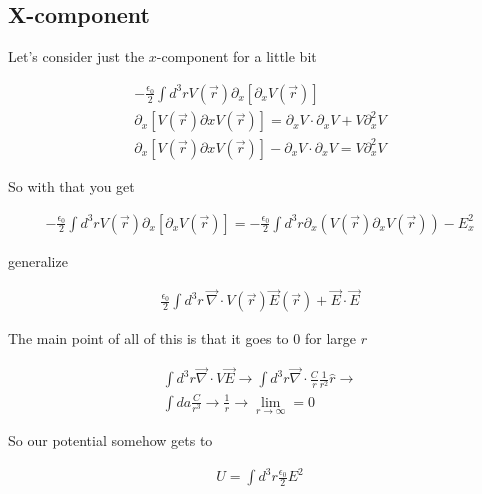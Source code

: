 \documentclass[fleqn]{report}
\newcommand{\del}{\partial}
\newcommand{\equations} [1] {
\begin{gather*}
#1
\end{gather*}
}
\begin{document}
\subsection{X-component}
Let's consider just the $x$-component for a little bit 

\equations{
    - \frac{\epsilon_0}{2} 
    \int d^3 r V(\vec r) \del_x \left[ \del_x V(\vec r) \right]
    \\
    \del_x \left[ V(\vec r) \del x V(\vec r) \right]
    =
    \del_x V \cdot \del_x V + V \del_x^2 V 
    \\
    \del_x \left[ V(\vec r) \del x V(\vec r) \right]
    - \del_x V \cdot \del_x V 
    =
    V \del_x^2 V 
}
So with that you get 
\equations{
    - \frac{\epsilon_0}{2} 
    \int d^3 r V(\vec r) \del_x \left[ \del_x V(\vec r)\right]
    =
    - \frac{\epsilon_0}{2} 
    \int d^3 r \del_x \left( V(\vec r) \del_x V (\vec r)\right)
    - E_x^2
}
generalize 
\equations{
    \frac{\epsilon_0}{2} 
    \int d^3 r \, \vec \nabla \cdot V(\vec r) \vec E(\vec r) + 
    \vec E \cdot \vec E 
}

The main point of all of this is that it goes to $0$ for large $r$ 
\equations{
    \int d^3 r \vec \nabla \cdot V \vec E 
    \rightarrow 
    \int d^3 r \vec \nabla \cdot \frac{C}{r} \frac{1}{r^2} \hat r 
    \rightarrow 
    \\
    \int da \frac{C}{r^3}
    \rightarrow 
    \frac{1}{r}
    \rightarrow \lim_{r \to \infty} = 0
}

So our potential somehow gets to 
\equations{
    U  =
    \int d^3 r \frac{\epsilon_0}{2} E^2 
}
\end{document}
